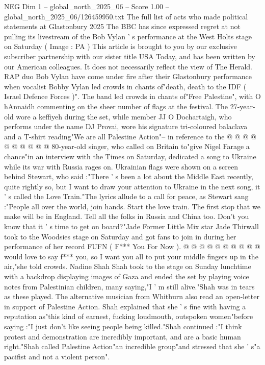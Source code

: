 \begin{textsample}{NEG Dim 1 – global\_north\_2025\_06 – Score 1.00 – global\_north\_2025\_06/126459950.txt}  \label{ex:f1_neg_125}
The full list of acts who made political statements at Glastonbury 2025 The BBC has since expressed regret at not pulling its livestream of the Bob Vylan ' s performance at the West Holts stage on Saturday ( Image : PA ) This article is brought to you by our exclusive subscriber partnership with our sister title USA Today, and has been written by our American colleagues.
It does not necessarily reflect the view of The Herald.
RAP duo Bob Vylan have come under fire after their Glastonbury performance when vocalist Bobby Vylan led crowds in chants of"death, death to the IDF ( Israel Defence Forces )".
The band led crowds in chants of"Free Palestine", with O hAnnaidh commenting on the sheer number of flags at the festival.
The 27-year-old wore a keffiyeh during the set, while member JJ O Dochartaigh, who performs under the name DJ Provai, wore his signature tri-coloured balaclava and a T-shirt reading"We are all Palestine Action"-- in reference to the @ @ @ @ @ @ @ @ @ @ 80-year-old singer, who called on Britain to"give Nigel Farage a chance"in an interview with the Times on Saturday, dedicated a song to Ukraine while its war with Russia rages on.
Ukrainian flags were shown on a screen behind Stewart, who said :"There ' s been a lot about the Middle East recently, quite rightly so, but I want to draw your attention to Ukraine in the next song, it ' s called the Love Train."The lyrics allude to a call for peace, as Stewart sang :"People all over the world, join hands.
Start the love train.
The first stop that we make will be in England.
Tell all the folks in Russia and China too.
Don't you know that it ' s time to get on board?"Jade Former Little Mix star Jade Thirwall took to the Woodsies stage on Saturday and got fans to join in during her performance of her record FUFN ( F*** You For Now ). @ @ @ @ @ @ @ @ @ @ would love to say f*** you, so I want you all to put your middle fingers up in the air,"she told crowds.
Nadine Shah Shah took to the stage on Sunday lunchtime with a backdrop displaying images of Gaza and ended the set by playing voice notes from Palestinian children, many saying,"I ' m still alive."Shah was in tears as these played.
The alternative musician from Whitburn also read an open-letter in support of Palestine Action.
Shah explained that she ' s fine with having a reputation as"this kind of earnest, fucking loudmouth, outspoken women"before saying :"I just don't like seeing people being killed."Shah continued :"I think protest and demonstration are incredibly important, and are a basic human right."Shah called Palestine Action"an incredible group"and stressed that she ' s"a pacifist and not a violent person".

\end{textsample}
